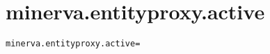 \section{minerva.entityproxy.active}
\label{configuration:MinervaEntityproxyActive}
\ClearAPI
\TODO
\begin{lstlisting}[style=Props,caption={Usage example for \textit{minerva.entityproxy.active}}]
minerva.entityproxy.active=
\end{lstlisting}